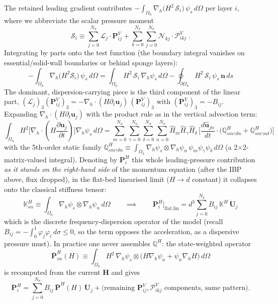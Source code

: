 \documentclass{article}
\newcommand{\Ns}{N_\sigma}
\newcommand{\uj}{\mathbf{u}_j}
\newcommand{\sumj}{\sum_{j=0}^{\Ns}}
\newcommand{\sumk}{\sum_{k=0}^{\Ns}}
\newcommand{\nablah}{\nabla_h}
\newcommand{\ddt}[1]{\frac{\partial #1}{\partial t}}
\newcommand{\vphij}{\varphi_j}
\newcommand{\VPij}{\mathbf{P}_{ij}^V}
\newcommand{\VPikj}{\boldsymbol{\mathcal{P}}_{ikj}^V}
\newcommand{\Nh}{N_h}
\newcommand{\sumNhn}{\sum_{n=0}^{\Nh}}
\newcommand{\sumNhm}{\sum_{m=0}^{\Nh}}
\newcommand{\sumNh}[1]{\sum_{#1=0}^{\Nh}}
\newcommand{\uhjn}{\hat{\mathbf{u}}_{jn}}
\newcommand{\Hm}{\hat{H}_m}
\newcommand{\Hvec}{\mathbf{H}}
\begin{document}
The retained leading gradient contributes $-\int_{\Omega_h}\nablah\big(H^2\,\mathcal{S}_i\big)\,\psi_s\,d\Omega$ per layer $i$, where we abbreviate the scalar pressure moment
$$\mathcal{S}_i \equiv \sumj \mathcal{L}_j\cdot\VPij + \sumk\sumj \mathcal{N}_{kj}\cdot\VPikj \;.$$
Integrating by parts onto the test function (the boundary integral vanishes on essential/solid-wall boundaries or behind sponge layers):
$$-\int_{\Omega_h}\nablah\big(H^2\mathcal{S}_i\big)\,\psi_s\,d\Omega = \int_{\Omega_h} H^2\,\mathcal{S}_i\,\nablah\psi_s\,d\Omega - \oint_{\partial\Omega_h} H^2\,\mathcal{S}_i\,\psi_s\,\mathbf{n}\,ds$$
The dominant, dispersion-carrying piece is the third component of the linear part, $(\mathcal{L}_j)_3(\VPij)_3 = -\nablah\cdot(H\partial_t\uj)\,(\VPij)_3$ with $(\VPij)_3 = -B_{ij}$. Expanding $\nablah\cdot(H\partial_t\uj)$ with the product rule as in the vertical advection term:
$$\int_{\Omega_h} H^2\big[\nablah\cdot(H\ddt{\uj})\big]\nablah\psi_s\,d\Omega
= \sumNhm\sumNh{\gamma}\sumNh{\delta}\sumNhn \Hm\hat{H}_\gamma\hat{H}_\delta\,\Big[\frac{d\uhjn}{dt}\cdot\big(\mathbb{Q}^H_{sm\gamma\delta n} + \mathbb{Q}^H_{sm\gamma n\delta}\big)\Big]$$
with the 5th-order static family $\mathbb{Q}^H_{sm\gamma\delta n} \equiv \int_{\Omega_h}\nablah\psi_s\otimes\nablah\psi_n\,\psi_m\psi_\gamma\psi_\delta\,d\Omega$ (a 2$\times$2-matrix-valued integral). Denoting by $\mathbf{P}_{i}^H$ this whole leading-pressure contribution \emph{as it stands on the right-hand side} of the momentum equation (after the IBP above, flux dropped), in the flat-bed linearised limit ($H\to d$ constant) it collapses onto the classical stiffness tensor:
\begin{equation}
    \boxed{\mathbb{K}^H_{sn} \equiv \int_{\Omega_h}\nablah\psi_s\otimes\nablah\psi_n\,d\Omega}
    \qquad\implies\qquad
    \mathbf{P}_{i}^H\Big|_{\text{flat,lin}} = d^3\sumj B_{ij}\,\mathbb{K}^H\,\dot{\mathbf{U}}_j
    \label{eq: def horizontal stiffness tensor}
\end{equation}
which is the discrete frequency-dispersion operator of the model (recall $B_{ij} = -\int_0^1\vphij\varphi_i\,d\sigma \le 0$, so the term opposes the acceleration, as a dispersive pressure must). In practice one never assembles $\mathbb{Q}^H$: the state-weighted operator
\begin{equation}
    \boxed{\bar{\mathbf{P}}^H_{sn}(H) \equiv \int_{\Omega_h} H^2\,\nablah\psi_s\otimes\big( H \nablah\psi_n + \psi_n \nablah H \big)\, d\Omega}
    \label{eq: def state weighted leading pressure operator}
\end{equation}
is recomputed from the current $\Hvec$ and gives
$$\mathbf{P}_i^H = \sumj B_{ij}\,\bar{\mathbf{P}}^H(H)\,\dot{\mathbf{U}}_j + \big(\text{remaining } \VPij, \VPikj \text{ components, same pattern}\big).$$
\end{document}
